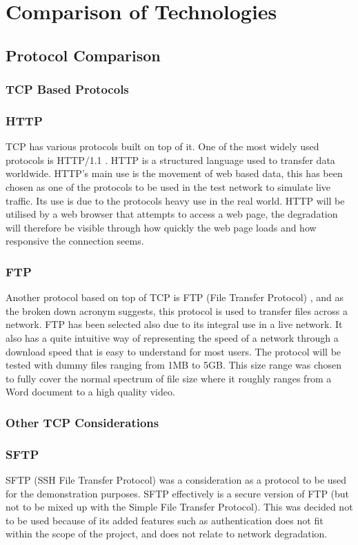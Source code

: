 \section{Comparison of Technologies}
\subsection{Protocol Comparison}
\subsubsection{TCP Based Protocols}

\subsubsection*{HTTP}
TCP has various protocols built on top of it. One of the most widely used protocols is HTTP/1.1 \citep{HTTP}. HTTP is a structured language used to transfer data worldwide. HTTP's main use is the movement of web based data, this has been chosen as one of the protocols to be used in the test network to simulate live traffic. Its use is due to the protocols heavy use in the real world. HTTP will be utilised by a web browser that attempts to access a web page, the degradation will therefore be visible through how quickly the web page loads and how responsive the connection seems.

\subsubsection*{FTP}
Another protocol based on top of TCP is FTP (File Transfer Protocol) \citep{FTP}, and as the broken down acronym suggests, this protocol is used to transfer files across a network. FTP has been selected also due to its integral use in a live network. It also has a quite intuitive way of representing the speed of a network through a download speed that is easy to understand for most users. The protocol will be tested with dummy files ranging from 1MB to 5GB. This size range was chosen to fully cover the normal spectrum of file size where it roughly ranges from a Word document to a high quality video.

\subsubsection*{Other TCP Considerations}

\subsubsection*{SFTP}
SFTP (SSH File Transfer Protocol) \citep{SFTP} was a consideration as a protocol to be used for the demonstration purposes. SFTP effectively is a secure version of FTP (but not to be mixed up with the Simple File Transfer Protocol). This was decided not to be used because of its added features such as authentication does not fit within the scope of the project, and does not relate to network degradation. 


